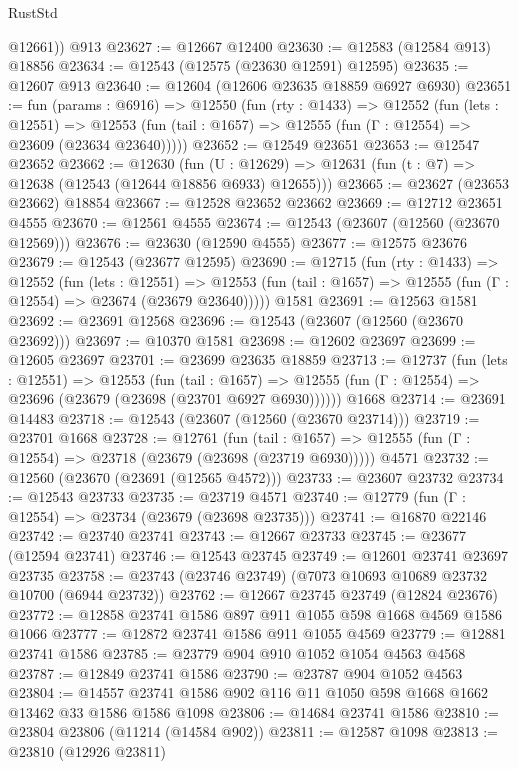 \begin{lexlean}{RustStd}
\begin{coremodule}
        @12661))
    @913
@23627 := @12667 @12400
@23630 := @12583 (@12584 @913) @18856
@23634 := @12543 (@12575 (@23630 @12591) @12595)
@23635 := @12607 @913
@23640 := @12604 (@12606 @23635 @18859 @6927 @6930)
@23651 := fun (params : @6916) =>
  @12550
    (fun (rty : @1433) =>
    @12552
      (fun (lets : @12551) =>
      @12553 (fun (tail : @1657) => @12555 (fun (Γ : @12554) => @23609 (@23634 @23640)))))
@23652 := @12549 @23651
@23653 := @12547 @23652
@23662 := @12630
    (fun (U : @12629) => @12631 (fun (t : @7) => @12638 (@12543 (@12644 @18856 @6933) @12655)))
@23665 := @23627 (@23653 @23662) @18854
@23667 := @12528 @23652 @23662
@23669 := @12712 @23651 @4555
@23670 := @12561 @4555
@23674 := @12543 (@23607 (@12560 (@23670 @12569)))
@23676 := @23630 (@12590 @4555)
@23677 := @12575 @23676
@23679 := @12543 (@23677 @12595)
@23690 := @12715
    (fun (rty : @1433) =>
    @12552
      (fun (lets : @12551) =>
      @12553 (fun (tail : @1657) => @12555 (fun (Γ : @12554) => @23674 (@23679 @23640)))))
    @1581
@23691 := @12563 @1581
@23692 := @23691 @12568
@23696 := @12543 (@23607 (@12560 (@23670 @23692)))
@23697 := @10370 @1581
@23698 := @12602 @23697
@23699 := @12605 @23697
@23701 := @23699 @23635 @18859
@23713 := @12737
    (fun (lets : @12551) =>
    @12553
      (fun (tail : @1657) =>
      @12555 (fun (Γ : @12554) => @23696 (@23679 (@23698 (@23701 @6927 @6930))))))
    @1668
@23714 := @23691 @14483
@23718 := @12543 (@23607 (@12560 (@23670 @23714)))
@23719 := @23701 @1668
@23728 := @12761
    (fun (tail : @1657) => @12555 (fun (Γ : @12554) => @23718 (@23679 (@23698 (@23719 @6930)))))
    @4571
@23732 := @12560 (@23670 (@23691 (@12565 @4572)))
@23733 := @23607 @23732
@23734 := @12543 @23733
@23735 := @23719 @4571
@23740 := @12779 (fun (Γ : @12554) => @23734 (@23679 (@23698 @23735)))
@23741 := @16870 @22146
@23742 := @23740 @23741
@23743 := @12667 @23733
@23745 := @23677 (@12594 @23741)
@23746 := @12543 @23745
@23749 := @12601 @23741 @23697 @23735
@23758 := @23743 (@23746 @23749) (@7073 @10693 @10689 @23732 @10700 (@6944 @23732))
@23762 := @12667 @23745 @23749 (@12824 @23676)
@23772 := @12858 @23741 @1586 @897 @911 @1055 @598 @1668 @4569 @1586 @1066
@23777 := @12872 @23741 @1586 @911 @1055 @4569
@23779 := @12881 @23741 @1586
@23785 := @23779 @904 @910 @1052 @1054 @4563 @4568
@23787 := @12849 @23741 @1586
@23790 := @23787 @904 @1052 @4563
@23804 := @14557 @23741 @1586 @902 @116 @11 @1050 @598 @1668 @1662 @13462 @33 @1586 @1586 @1098
@23806 := @14684 @23741 @1586
@23810 := @23804 @23806 (@11214 (@14584 @902))
@23811 := @12587 @1098
@23813 := @23810 (@12926 @23811)

\end{coremodule}
\end{lexlean}
